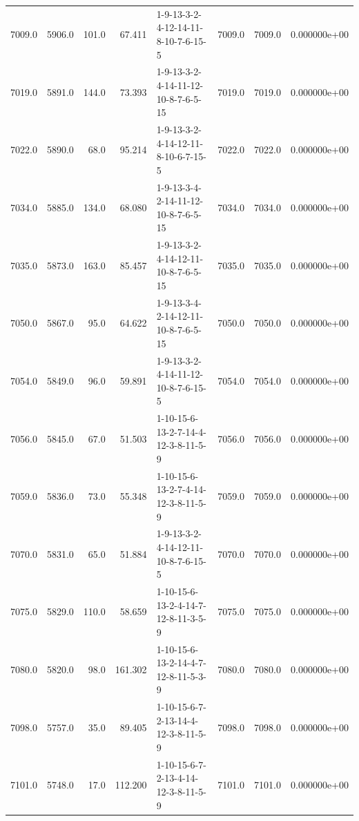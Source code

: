 \begin{tabular}{rrrrlrrr}
 7009.0 &  5906.0 &          101.0 &             67.411 &  1-9-13-3-2-4-12-14-11-8-10-7-6-15-5 &        7009.0 &          7009.0 &  0.000000e+00 \\
 7019.0 &  5891.0 &          144.0 &             73.393 &  1-9-13-3-2-4-14-11-12-10-8-7-6-5-15 &        7019.0 &          7019.0 &  0.000000e+00 \\
 7022.0 &  5890.0 &           68.0 &             95.214 &  1-9-13-3-2-4-14-12-11-8-10-6-7-15-5 &        7022.0 &          7022.0 &  0.000000e+00 \\
 7034.0 &  5885.0 &          134.0 &             68.080 &  1-9-13-3-4-2-14-11-12-10-8-7-6-5-15 &        7034.0 &          7034.0 &  0.000000e+00 \\
 7035.0 &  5873.0 &          163.0 &             85.457 &  1-9-13-3-2-4-14-12-11-10-8-7-6-5-15 &        7035.0 &          7035.0 &  0.000000e+00 \\
 7050.0 &  5867.0 &           95.0 &             64.622 &  1-9-13-3-4-2-14-12-11-10-8-7-6-5-15 &        7050.0 &          7050.0 &  0.000000e+00 \\
 7054.0 &  5849.0 &           96.0 &             59.891 &  1-9-13-3-2-4-14-11-12-10-8-7-6-15-5 &        7054.0 &          7054.0 &  0.000000e+00 \\
 7056.0 &  5845.0 &           67.0 &             51.503 &  1-10-15-6-13-2-7-14-4-12-3-8-11-5-9 &        7056.0 &          7056.0 &  0.000000e+00 \\
 7059.0 &  5836.0 &           73.0 &             55.348 &  1-10-15-6-13-2-7-4-14-12-3-8-11-5-9 &        7059.0 &          7059.0 &  0.000000e+00 \\
 7070.0 &  5831.0 &           65.0 &             51.884 &  1-9-13-3-2-4-14-12-11-10-8-7-6-15-5 &        7070.0 &          7070.0 &  0.000000e+00 \\
 7075.0 &  5829.0 &          110.0 &             58.659 &  1-10-15-6-13-2-4-14-7-12-8-11-3-5-9 &        7075.0 &          7075.0 &  0.000000e+00 \\
 7080.0 &  5820.0 &           98.0 &            161.302 &  1-10-15-6-13-2-14-4-7-12-8-11-5-3-9 &        7080.0 &          7080.0 &  0.000000e+00 \\
 7098.0 &  5757.0 &           35.0 &             89.405 &  1-10-15-6-7-2-13-14-4-12-3-8-11-5-9 &        7098.0 &          7098.0 &  0.000000e+00 \\
 7101.0 &  5748.0 &           17.0 &            112.200 &  1-10-15-6-7-2-13-4-14-12-3-8-11-5-9 &        7101.0 &          7101.0 &  0.000000e+00 \\

\end{tabular}

